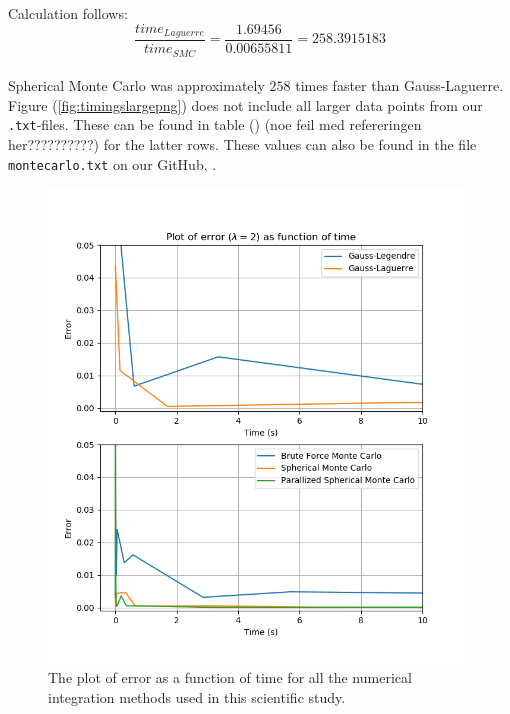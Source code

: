 \documentclass{article}
\begin{document}
Calculation follows: \\

$$\frac{time_{Laguerre}}{time_{SMC}} = \frac{1.69456}{0.00655811} = 258.3915183$$ \\

Spherical Monte Carlo was approximately $258$ times faster than Gauss-Laguerre.\\

Figure (\ref{fig:timingslargepng}) does not include all larger data points from our \texttt{.txt}-files. These can be found in table () (noe feil med refereringen her??????????) for the latter rows. These values can also be found in the file \texttt{montecarlo.txt} on our GitHub, \cite{github}.

\begin{figure}[ht]
    \centering
    \includegraphics[width = 11cm]{images/method-timings-small.png}
    \caption{The plot of error as a function of time for all the numerical integration methods used in this scientific study. }
    \label{fig:timingssmallpng}
\end{figure}
\end{document}
